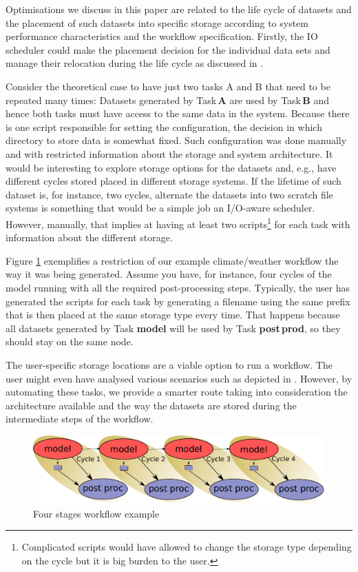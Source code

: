 \documentclass[a4paper]{article}
\begin{document}
Optimisations we discuss in this paper are related to the life cycle of datasets and the placement of such datasets into specific storage according to system performance characteristics and the workflow specification.
Firstly, the IO scheduler could make the placement decision for the individual data sets and manage their relocation during the life cycle as discussed in .

Consider the theoretical case to have just two tasks A and B that need to be repeated many times:
Datasets generated by Task\,\textbf{A} are used by Task\,\textbf{B} and hence both tasks must have access to the same data in the system.
Because there is one script responsible for setting the configuration, the decision in which directory to store data is somewhat fixed.
Such configuration was done manually and with restricted information about the storage and system architecture.
It would be interesting to explore storage options for the datasets and, e.g., have different cycles stored placed in different storage systems.
If the lifetime of such dataset is, for instance, two cycles, alternate the datasets into two scratch file systems is something that would be a simple job an I/O-aware scheduler.
However, manually, that implies at having at least two scripts\footnote{Complicated scripts would have allowed to change the storage type depending on the cycle but it is big burden to the user.} for each task with information about the different storage.

Figure \ref{fig:cycle-4} exemplifies a restriction of our example climate/weather workflow the way it was being generated.
Assume you have, for instance, four cycles of the model running with all the required post-processing steps.
Typically, the user has generated the scripts for each task by generating a filename using the same prefix that is then placed at the same storage type every time.
That happens because all datasets generated by Task \textbf{model} will be used by Task \textbf{post\,prod}, so they should stay on the same node.


The user-specific storage locations are a viable option to run a workflow.
The user might even have analysed various scenarios such as depicted in
.
However, by automating these tasks, we provide a smarter route taking into consideration the architecture available and the way the datasets are stored during the intermediate steps of the workflow.


\begin{figure}[H]
  \centering
  \includegraphics[width=0.8\columnwidth]{cycle-4}
  \caption{Four stages workflow example}
  \label{fig:cycle-4}
\end{figure}
\end{document}

